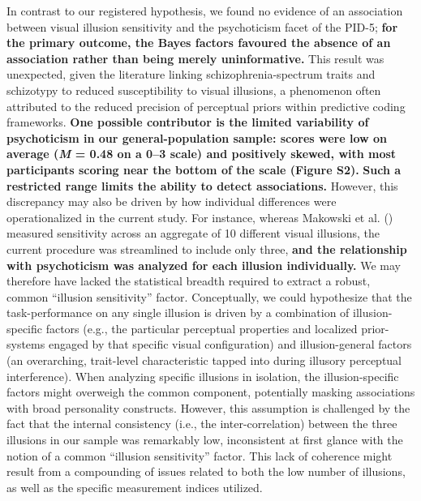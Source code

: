 \documentclass[
  man,
  floatsintext,
  longtable,
  nolmodern,
  notxfonts,
  notimes,
  colorlinks=true,linkcolor=blue,citecolor=blue,urlcolor=blue]{apa7}
\begin{document}
In contrast to our registered hypothesis, we found no evidence of an
association between visual illusion sensitivity and the psychoticism
facet of the PID-5; \textbf{for the primary outcome, the Bayes factors
favoured the absence of an association rather than being merely
uninformative.} This result was unexpected, given the literature linking
schizophrenia-spectrum traits and schizotypy to reduced susceptibility
to visual illusions, a phenomenon often attributed to the reduced
precision of perceptual priors within predictive coding frameworks.
\textbf{One possible contributor is the limited variability of
psychoticism in our general-population sample: scores were low on
average (\emph{M} = 0.48 on a 0--3 scale) and positively skewed, with
most participants scoring near the bottom of the scale (Figure S2).}
\textbf{Such a restricted range limits the ability to detect
associations.} However, this discrepancy may also be driven by how
individual differences were operationalized in the current study. For
instance, whereas Makowski et al. ()
measured sensitivity across an aggregate of 10 different visual
illusions, the current procedure was streamlined to include only three,
\textbf{and the relationship with psychoticism was analyzed for each
illusion individually.} We may therefore have lacked the statistical
breadth required to extract a robust, common ``illusion sensitivity''
factor. Conceptually, we could hypothesize that the task-performance on
any single illusion is driven by a combination of illusion-specific
factors (e.g., the particular perceptual properties and localized
prior-systems engaged by that specific visual configuration) and
illusion-general factors (an overarching, trait-level characteristic
tapped into during illusory perceptual interference). When analyzing
specific illusions in isolation, the illusion-specific factors might
overweigh the common component, potentially masking associations with
broad personality constructs. However, this assumption is challenged by
the fact that the internal consistency (i.e., the inter-correlation)
between the three illusions in our sample was remarkably low,
inconsistent at first glance with the notion of a common ``illusion
sensitivity'' factor. This lack of coherence might result from a
compounding of issues related to both the low number of illusions, as
well as the specific measurement indices utilized.
\end{document}
